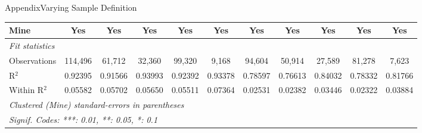 \documentclass[aspectratio=169,11pt,dvipsnames, handout]{beamer}
\begin{document}
\begin{frame}{\textcolor{defaultclr!30}{Appendix}\hspace{0.75em}Varying Sample Definition}
\begin{adjustbox}{width = \textwidth, center}
\begin{tabular}{lcccccccccc}
      Mine                     & Yes             & Yes             & Yes             & Yes             & Yes            & Yes             & Yes             & Yes             & Yes            & Yes\\  
      \midrule
      \emph{Fit statistics}\\
      Observations             & 114,496         & 61,712          & 32,360          & 99,320          & 9,168          & 94,604          & 50,914          & 27,589          & 81,278         & 7,623\\  
      R$^2$                    & 0.92395         & 0.91566         & 0.93993         & 0.92392         & 0.93378        & 0.78597         & 0.76613         & 0.84032         & 0.78332        & 0.81766\\  
      Within R$^2$             & 0.05582         & 0.05702         & 0.05650         & 0.05511         & 0.07364        & 0.02531         & 0.02382         & 0.03446         & 0.02322        & 0.03884\\  
      \midrule \midrule
      \multicolumn{11}{l}{\emph{Clustered (Mine) standard-errors in parentheses}}\\
      \multicolumn{11}{l}{\emph{Signif. Codes: ***: 0.01, **: 0.05, *: 0.1}}\\
   \end{tabular}
\end{adjustbox}


 \centering\hyperlink{frame:robust}{} 
    
\end{frame}

\end{document}
